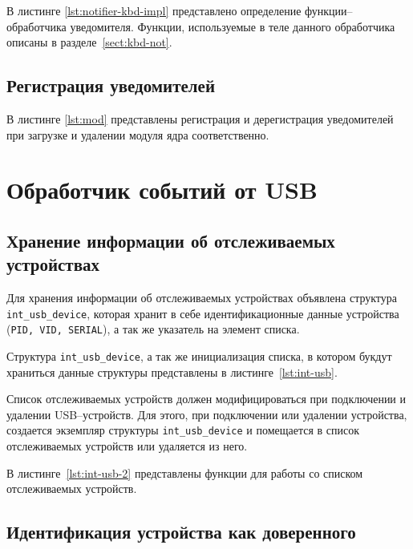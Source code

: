 
В листинге \ref{lst:notifier-kbd-impl} представлено определение функции--обработчика уведомителя. Функции, используемые в теле данного обработчика описаны в разделе~\ref{sect:kbd-not}.


\subsection{Регистрация уведомителей}

В листинге \ref{lst:mod} представлены регистрация и дерегистрация уведомителей при загрузке и удалении модуля ядра соответственно.


\section{Обработчик событий от USB}

\subsection{Хранение информации об отслеживаемых устройствах}

Для хранения информации об отслеживаемых устройствах объявлена структура \texttt{int\_usb\_device}, которая хранит в себе идентификационные данные устройства (\texttt{PID, VID, SERIAL}), а так же указатель на элемент списка.

Структура \texttt{int\_usb\_device}, а так же инициализация списка, в котором букдут храниться данные структуры представлены в листинге~\ref{lst:int-usb}.


Список отслеживаемых устройств должен модифицироваться при подключении и удалении USB--устройств. Для этого, при подключении или удалении устройства, создается экземпляр структуры \texttt{int\_usb\_device} и помещается в список отслеживаемых устройств или удаляется из него.

В листинге~\ref{lst:int-usb-2} представлены функции для работы со списком отслеживаемых устройств.

\subsection{Идентификация устройства как доверенного}

